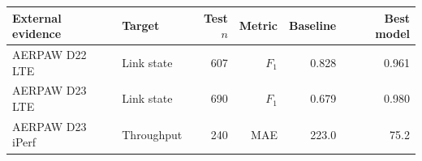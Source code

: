 \begin{tabular}{llrrrr}
\toprule
External evidence & Target & Test $n$ & Metric & Baseline & Best model \\
\midrule
AERPAW D22 LTE & Link state & 607 & $F_1$ & 0.828 & 0.961 \\
AERPAW D23 LTE & Link state & 690 & $F_1$ & 0.679 & 0.980 \\
AERPAW D23 iPerf & Throughput & 240 & MAE & 223.0 & 75.2 \\
\bottomrule
\end{tabular}
